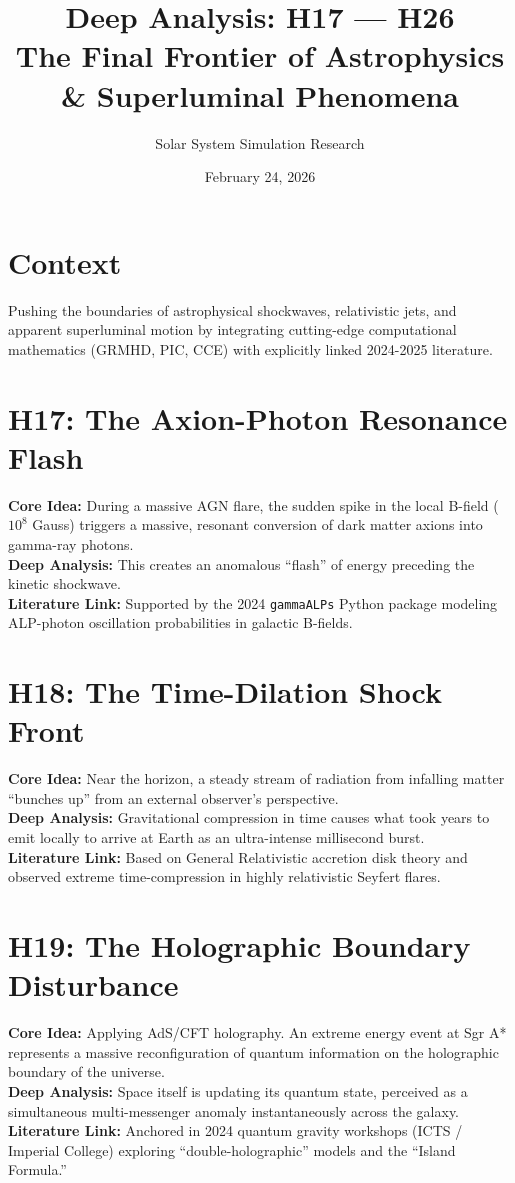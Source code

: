 \documentclass{article}
\title{Deep Analysis: H17 --- H26 \\ \large The Final Frontier of Astrophysics \& Superluminal Phenomena}
\author{Solar System Simulation Research}
\date{February 24, 2026}
\begin{document}
\maketitle

\section*{Context}
Pushing the boundaries of astrophysical shockwaves, relativistic jets, and apparent superluminal motion by integrating cutting-edge computational mathematics (GRMHD, PIC, CCE) with explicitly linked 2024-2025 literature.

\section*{H17: The Axion-Photon Resonance Flash}
\textbf{Core Idea:} During a massive AGN flare, the sudden spike in the local B-field ($10^8$ Gauss) triggers a massive, resonant conversion of dark matter axions into gamma-ray photons. \\
\textbf{Deep Analysis:} This creates an anomalous ``flash'' of energy preceding the kinetic shockwave. \\
\textbf{Literature Link:} Supported by the 2024 \texttt{gammaALPs} Python package modeling ALP-photon oscillation probabilities in galactic B-fields.

\section*{H18: The Time-Dilation Shock Front}
\textbf{Core Idea:} Near the horizon, a steady stream of radiation from infalling matter ``bunches up'' from an external observer's perspective. \\
\textbf{Deep Analysis:} Gravitational compression in time causes what took years to emit locally to arrive at Earth as an ultra-intense millisecond burst. \\
\textbf{Literature Link:} Based on General Relativistic accretion disk theory and observed extreme time-compression in highly relativistic Seyfert flares.

\section*{H19: The Holographic Boundary Disturbance}
\textbf{Core Idea:} Applying AdS/CFT holography. An extreme energy event at Sgr A* represents a massive reconfiguration of quantum information on the holographic boundary of the universe. \\
\textbf{Deep Analysis:} Space itself is updating its quantum state, perceived as a simultaneous multi-messenger anomaly instantaneously across the galaxy. \\
\textbf{Literature Link:} Anchored in 2024 quantum gravity workshops (ICTS / Imperial College) exploring ``double-holographic'' models and the ``Island Formula.''
\end{document}

